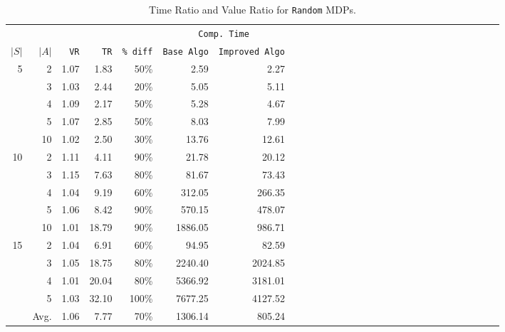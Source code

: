 \begin{table} %
 \setlength{\tabcolsep}{2.5pt}
 \renewcommand \arraystretch{1.5}
\begin{center}
\begin{tabular}{rrrrrrrrrrrrrrrrrrrrrrrrrrrr}
	&		&				&				&				&	\multicolumn{2}{c}{	\texttt{Comp. Time}}	\\
$|S|$	&	$|A|$	&		\texttt{VR}		&		\texttt{TR}		&		\texttt{\% diff}		&	\texttt{Base Algo}	&	\texttt{Improved Algo}	\\
\cmidrule(lr){1-2} \cmidrule(lr){3-3} \cmidrule(lr){4-4}  \cmidrule(lr){5-5}  \cmidrule(lr){6-7}
5	&	2	&			1.07	&			1.83	&			50\%	&	2.59	&	2.27	\\
	&	3	&			1.03	&			2.44	&			20\%	&	5.05	&	5.11	\\
	&	4	&			1.09	&			2.17	&			50\%	&	5.28	&	4.67	\\
	&	5	&			1.07	&			2.85	&			50\%	&	8.03	&	7.99	\\
	&	10	&			1.02	&			2.50	&			30\%	&	13.76	&	12.61	\\
\cmidrule(lr){1-2} \cmidrule(lr){3-3} \cmidrule(lr){4-4}  \cmidrule(lr){5-5}  \cmidrule(lr){6-7}
10	&	2	&			1.11	&			4.11	&			90\%	&	21.78	&	20.12	\\
	&	3	&			1.15	&			7.63	&			80\%	&	81.67	&	73.43	\\
	&	4	&			1.04	&			9.19	&			60\%	&	312.05	&	266.35	\\
	&	5	&			1.06	&			8.42	&			90\%	&	570.15	&	478.07	\\
	&	10	&			1.01	&			18.79	&			90\%	&	1886.05	&	986.71	\\
\cmidrule(lr){1-2} \cmidrule(lr){3-3} \cmidrule(lr){4-4}  \cmidrule(lr){5-5}  \cmidrule(lr){6-7}
15	&	2	&			1.04	&			6.91	&			60\%	&	94.95	&	82.59	\\
	&	3	&			1.05	&			18.75	&			80\%	&	2240.40	&	2024.85	\\
	&	4	&			1.01	&			20.04	&			80\%	&	5366.92	&	3181.01	\\
	&	5	&			1.03	&			32.10	&			100\%	&	7677.25	&	4127.52	\\
\cmidrule(lr){1-2} \cmidrule(lr){3-3} \cmidrule(lr){4-4}  \cmidrule(lr){5-5}  \cmidrule(lr){6-7}
	&	Avg.	&			1.06	&			7.77	&			70\%	&	1306.14	&	805.24	
\end{tabular}						
\end{center}
\caption{Time Ratio and Value Ratio for \texttt{Random} MDPs.}														\label{tab:random}								
\end{table} %
